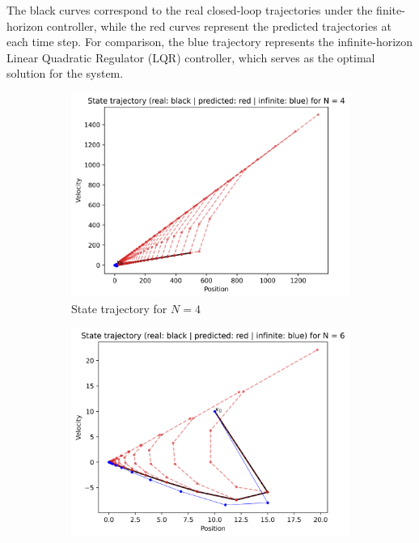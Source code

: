 \documentclass[]{article}
\begin{document}
\begin{itemize}
	The black curves correspond to the real closed-loop trajectories under the finite-horizon controller, while the red curves represent the predicted trajectories at each time step. 
	For comparison, the blue trajectory represents the infinite-horizon Linear Quadratic Regulator (LQR) controller, which serves as the optimal solution for the system. 
	\begin{figure}[H]
		\centering
		\begin{subfigure}[b]{0.45\textwidth}
			\centering
			\includegraphics[width=\textwidth]{images/Assignment_11_N4.png}
			\caption{State trajectory for $N=4$}
			\label{fig:imgN4}
		\end{subfigure}
		\hfill
		\begin{subfigure}[b]{0.45\textwidth}
			\centering
			\includegraphics[width=\textwidth]{images/Assignment_11_N6.png}

\end{subfigure}
\end{figure}
\end{itemize}
\end{document}
